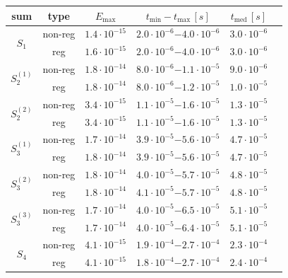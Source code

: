 \documentclass[]{amsart}
\newcommand{\new}[1]{#1}
\numberwithin{mythm}{section}
\begin{document}
\begin{table}
\centering
\begin{tabular}{cccccc}
    \toprule
    sum & type & \(E_{\mathrm{max}}\) & \(t_{\mathrm{min}}-t_{\mathrm{max}}\,[s]\) & \(\new{t_{\mathrm{med}}\,[s]}\)\\
\midrule
\midrule
\multirow{2}{*}{$S_1$} & non-reg & $1.4\cdot 10^{-15}$ & $2.0\cdot 10^{-6}$$-$$4.0\cdot 10^{-6}$ & $3.0\cdot 10^{-6}$ \\ 
			         & reg & $1.6\cdot 10^{-15}$ & $2.0\cdot 10^{-6}$$-$$4.0\cdot 10^{-6}$ & $3.0\cdot 10^{-6}$ \\

\midrule
\multirow{2}{*}{$S_2^{(1)}$} & non-reg & $1.8\cdot 10^{-14}$ & $8.0\cdot 10^{-6}$$-$$1.1\cdot 10^{-5}$ & $9.0\cdot 10^{-6}$ \\ 
			         & reg & $1.8\cdot 10^{-14}$ & $8.0\cdot 10^{-6}$$-$$1.2\cdot 10^{-5}$ & $1.0\cdot 10^{-5}$ \\

\midrule
\multirow{2}{*}{$S_2^{(2)}$} & non-reg & $3.4\cdot 10^{-15}$ & $1.1\cdot 10^{-5}$$-$$1.6\cdot 10^{-5}$ & $1.3\cdot 10^{-5}$ \\ 
			         & reg & $3.4\cdot 10^{-15}$ & $1.1\cdot 10^{-5}$$-$$1.6\cdot 10^{-5}$ & $1.3\cdot 10^{-5}$ \\

\midrule
\multirow{2}{*}{$S_3^{(1)}$} & non-reg & $1.7\cdot 10^{-14}$ & $3.9\cdot 10^{-5}$$-$$5.6\cdot 10^{-5}$ & $4.7\cdot 10^{-5}$ \\ 
			         & reg & $1.8\cdot 10^{-14}$ & $3.9\cdot 10^{-5}$$-$$5.6\cdot 10^{-5}$ & $4.7\cdot 10^{-5}$ \\

\midrule
\multirow{2}{*}{$S_3^{(2)}$} & non-reg & $1.8\cdot 10^{-14}$ & $4.0\cdot 10^{-5}$$-$$5.7\cdot 10^{-5}$ & $4.8\cdot 10^{-5}$ \\ 
			         & reg & $1.8\cdot 10^{-14}$ & $4.1\cdot 10^{-5}$$-$$5.7\cdot 10^{-5}$ & $4.8\cdot 10^{-5}$ \\

\midrule
\multirow{2}{*}{$S_3^{(3)}$} & non-reg & $1.7\cdot 10^{-14}$ & $4.0\cdot 10^{-5}$$-$$6.5\cdot 10^{-5}$ & $5.1\cdot 10^{-5}$ \\ 
			         & reg & $1.7\cdot 10^{-14}$ & $4.0\cdot 10^{-5}$$-$$6.4\cdot 10^{-5}$ & $5.1\cdot 10^{-5}$ \\

\midrule
\multirow{2}{*}{$S_4$} & non-reg & $4.1\cdot 10^{-15}$ & $1.9\cdot 10^{-4}$$-$$2.7\cdot 10^{-4}$ & $2.3\cdot 10^{-4}$ \\ 
			         & reg & $4.1\cdot 10^{-15}$ & $1.8\cdot 10^{-4}$$-$$2.7\cdot 10^{-4}$ & $2.4\cdot 10^{-4}$ \\


\end{tabular}
\end{table}
\end{document}
